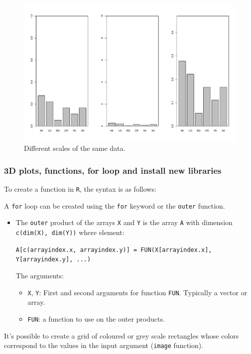 \documentclass[a4paper]{article}
\begin{document}
    \begin{figure}[!htp]
        \centering
        \includegraphics[width=\textwidth]{img/visualization-of-categorical-data-5.pdf}
        \caption*{Different scales of the same data.}
    \end{figure}

    \newpage

    \subsubsection{3D plots, functions, for loop and install new libraries}

    To create a function in \texttt{R}, the syntax is as follows:
    
    A \texttt{for} loop can be created using the \texttt{for} keyword or the \texttt{outer} function.
    \begin{itemize}
        \item The \texttt{outer} product of the arrays \texttt{X} and \texttt{Y} is the array \texttt{A} with dimension \texttt{c(dim(X), dim(Y))} where element:
        \begin{center}
            \texttt{A[c(arrayindex.x, arrayindex.y)] = FUN(X[arrayindex.x], Y[arrayindex.y], ...)}
        \end{center}
        The arguments:
        \begin{itemize}
            \item \texttt{X}, \texttt{Y}: First and second arguments for function \texttt{FUN}. Typically a vector or array.
            
            \item \texttt{FUN}: a function to use on the outer products.
        \end{itemize}
    \end{itemize}
    
    It's possible to create a grid of coloured or grey scale rectangles whose colors correspond to the values in the input argument (\texttt{image} function).
    
\end{document}
